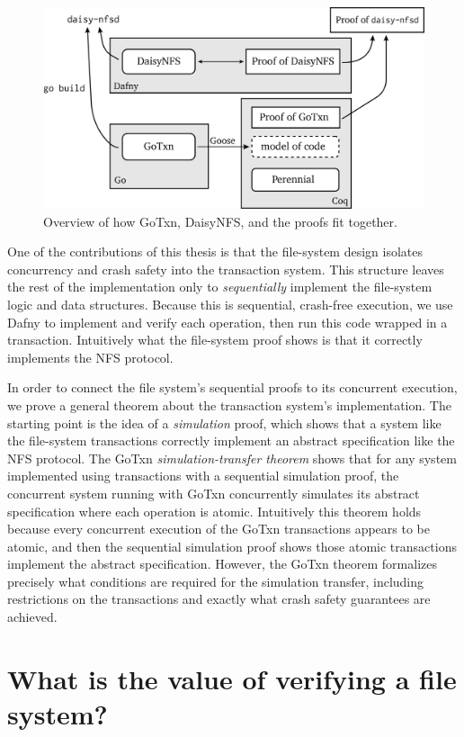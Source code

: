 \begin{figure}[ht]
\includegraphics{fig/overview.png}
\caption{Overview of how GoTxn, DaisyNFS, and the proofs fit together.}
\label{fig:overview}
\end{figure}

One of the contributions of this thesis is that the file-system design isolates
concurrency and crash safety into the transaction system. This structure leaves
the rest of the implementation only to \emph{sequentially} implement the
file-system logic and data structures. Because this is sequential, crash-free
execution, we use Dafny to implement and verify each operation, then run this
code wrapped in a transaction. Intuitively what the file-system proof shows is
that it correctly implements the NFS protocol.

In order to connect the file system's sequential proofs to its concurrent
execution, we prove a general theorem about the transaction system's
implementation. The starting point is the idea of a \emph{simulation} proof,
which shows that a system like the file-system transactions correctly implement an
abstract specification like the NFS protocol. The GoTxn
\emph{simulation-transfer theorem} shows that for any system implemented using
transactions with a sequential simulation proof, the concurrent system running
with GoTxn concurrently simulates its abstract specification where each
operation is atomic. Intuitively this theorem holds because every concurrent
execution of the GoTxn transactions appears to be atomic, and then the
sequential simulation proof shows those atomic transactions implement the
abstract specification. However, the GoTxn theorem formalizes precisely what
conditions are required for the simulation transfer, including restrictions on
the transactions and exactly what crash safety guarantees are achieved.

\section{What is the value of verifying a file system?}

